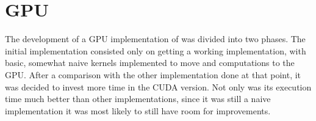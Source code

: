 \section{GPU}
\label{sec:cuda}

The development of a GPU implementation of \polu was divided into two phases.
The initial implementation consisted only on getting a working implementation, with basic, somewhat naive kernels implemented to move \computeflux and \update computations to the GPU.
After a comparison with the other implementation done at that point, it was decided to invest more time in the CUDA version.
Not only was its execution time much better than other implementations, since it was still a naive implementation it was most likely to still have room for improvements.





